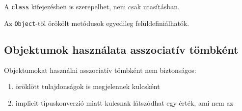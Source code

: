 \begin{frame}
    \begin{exampleblock}{}
        \footnotesize
        
    \end{exampleblock}
\end{frame}

\begin{frame}
    A \texttt{class} kifejezésben is szerepelhet, nem csak utasításban.
    \begin{exampleblock}{}
        \small
        
    \end{exampleblock}
\end{frame}

\begin{frame}
    Az \texttt{Object}-től örökölt metódusok egyedileg felüldefiniálhatók.
    \begin{exampleblock}{}
        \small
        
    \end{exampleblock}
\end{frame}

\subsection{Objektumok használata asszociatív tömbként}

\begin{frame}
    \footnotesize
    Objektumokat használni asszociatív tömbként nem biztonságos:
    \begin{enumerate}
        \item öröklött tulajdonságok is megjelennek kulcsként
        \item implicit típuskonverzió miatt kulcsnak látszódhat egy érték, ami nem az
    \end{enumerate}
    \begin{exampleblock}{}
        \vspace{-.2cm}
        \scriptsize
        
        \vspace{-.2cm}
    \end{exampleblock}
\end{frame}

